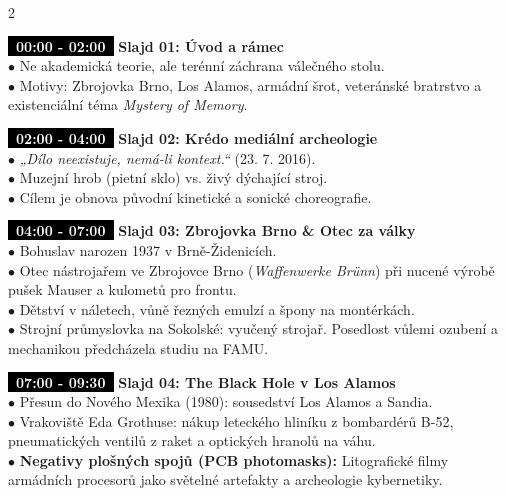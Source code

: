 \documentclass[a4paper,9.5pt]{article}
\newcommand{\badge}[1]{\textbf{\colorbox{black}{\textcolor{white}{\footnotesize~#1~}}}}
\begin{document}
\begin{multicols}{2}

\begin{tcolorbox}
\badge{00:00 - 02:00} \textbf{Slajd 01: Úvod a rámec}\\
$\bullet$ Ne akademická teorie, ale terénní záchrana válečného stolu.\\
$\bullet$ Motivy: Zbrojovka Brno, Los Alamos, armádní šrot, veteránské bratrstvo a existenciální téma \textit{Mystery of Memory}.
\end{tcolorbox}

\begin{tcolorbox}
\badge{02:00 - 04:00} \textbf{Slajd 02: Krédo mediální archeologie}\\
$\bullet$ \textit{„Dílo neexistuje, nemá-li kontext.“} (23. 7. 2016).\\
$\bullet$ Muzejní hrob (pietní sklo) vs. živý dýchající stroj.\\
$\bullet$ Cílem je obnova původní kinetické a sonické choreografie.
\end{tcolorbox}

\begin{tcolorbox}
\badge{04:00 - 07:00} \textbf{Slajd 03: Zbrojovka Brno \& Otec za války}\\
$\bullet$ Bohuslav narozen 1937 v Brně-Židenicích.\\
$\bullet$ Otec nástrojařem ve Zbrojovce Brno (\textit{Waffenwerke Brünn}) při nucené výrobě pušek Mauser a kulometů pro frontu.\\
$\bullet$ Dětství v náletech, vůně řezných emulzí a špony na montérkách.\\
$\bullet$ Strojní průmyslovka na Sokolské: vyučený strojař. Posedlost vůlemi ozubení a mechanikou předcházela studiu na FAMU.
\end{tcolorbox}

\begin{tcolorbox}
\badge{07:00 - 09:30} \textbf{Slajd 04: The Black Hole v Los Alamos}\\
$\bullet$ Přesun do Nového Mexika (1980): sousedství Los Alamos a Sandia.\\
$\bullet$ Vrakoviště Eda Grothuse: nákup leteckého hliníku z bombardérů B-52, pneumatických ventilů z raket a optických hranolů na váhu.\\
$\bullet$ \textbf{Negativy plošných spojů (PCB photomasks):} Litografické filmy armádních procesorů jako světelné artefakty a archeologie kybernetiky.
\end{tcolorbox}


\end{multicols}
\end{document}
